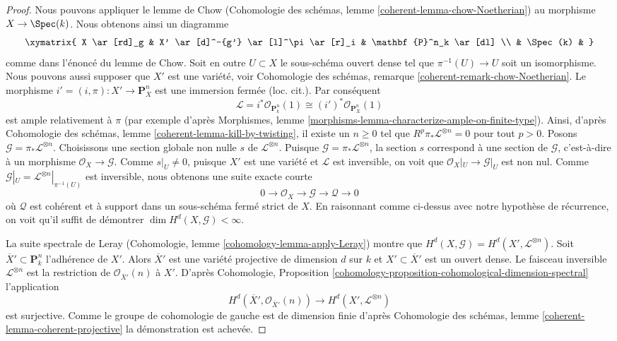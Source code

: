 \begin{proof}
\medskip\noindent
Nous pouvons appliquer le lemme de Chow
(Cohomologie des schémas, lemme \ref{coherent-lemma-chow-Noetherian})
au morphisme $X \to \Spec(k)$. Nous obtenons ainsi un diagramme
$$
\xymatrix{
X \ar[rd]_g & X' \ar[d]^-{g'} \ar[l]^\pi \ar[r]_i & \mathbf{P}^n_k \ar[dl] \\
& \Spec(k) &
}
$$
comme dans l'\'enonc\'e du lemme de Chow. Soit en outre $U \subset X$
le sous-sch\'ema ouvert dense tel que $\pi^{-1}(U) \to U$ soit un isomorphisme.
Nous pouvons aussi supposer que $X'$ est une vari\'et\'e, voir
Cohomologie des schémas, remarque \ref{coherent-remark-chow-Noetherian}.
Le morphisme $i' = (i, \pi) : X' \to \mathbf{P}^n_X$ est
une immersion ferm\'ee (loc. cit.). Par cons\'equent
$$
\mathcal{L} = i^*\mathcal{O}_{\mathbf{P}^n_k}(1) \cong
(i')^*\mathcal{O}_{\mathbf{P}^n_X}(1)
$$
est ample relativement \`a $\pi$ (par exemple d'apr\`es
Morphismes, lemme \ref{morphisms-lemma-characterize-ample-on-finite-type}).
Ainsi, d'apr\`es Cohomologie des schémas, lemme \ref{coherent-lemma-kill-by-twisting},
il existe un $n \geq 0$ tel que
$R^p\pi_*\mathcal{L}^{\otimes n} = 0$ pour tout $p > 0$.
Posons $\mathcal{G} = \pi_*\mathcal{L}^{\otimes n}$.
Choisissons une section globale non nulle $s$ de $\mathcal{L}^{\otimes n}$.
Puisque $\mathcal{G} = \pi_*\mathcal{L}^{\otimes n}$, la section $s$
correspond \`a une section de $\mathcal{G}$, c'est-\`a-dire \`a un morphisme
$\mathcal{O}_X \to \mathcal{G}$.
Comme $s|_U \not = 0$, puisque $X'$ est une vari\'et\'e et $\mathcal{L}$ est
inversible, on voit que $\mathcal{O}_X|_U \to \mathcal{G}|_U$
est non nul. Comme $\mathcal{G}|_U = \mathcal{L}^{\otimes n}|_{\pi^{-1}(U)}$
est inversible, nous obtenons une suite exacte courte
$$
0 \to \mathcal{O}_X \to \mathcal{G} \to \mathcal{Q} \to 0
$$
o\`u $\mathcal{Q}$ est coh\'erent et \`a support dans un sous-sch\'ema
ferm\'e strict de $X$. En raisonnant comme ci-dessus avec notre hypoth\`ese de
r\'ecurrence, on voit qu'il
suffit de d\'emontrer $\dim H^d(X, \mathcal{G}) < \infty$.

\medskip\noindent
La suite spectrale de Leray
(Cohomologie, lemme \ref{cohomology-lemma-apply-Leray})
montre que $H^d(X, \mathcal{G}) = H^d(X', \mathcal{L}^{\otimes n})$.
Soit $\overline{X}' \subset \mathbf{P}^n_k$ l'adh\'erence
de $X'$. Alors $\overline{X}'$ est une vari\'et\'e projective de dimension $d$
sur $k$ et $X' \subset \overline{X}'$ est un ouvert dense.
Le faisceau inversible $\mathcal{L}^{\otimes n}$ est la restriction de
$\mathcal{O}_{\overline{X}'}(n)$ \`a $X'$. D'apr\`es
Cohomologie, Proposition
\ref{cohomology-proposition-cohomological-dimension-spectral}
l'application
$$
H^d(\overline{X}', \mathcal{O}_{\overline{X}'}(n))
\longrightarrow
H^d(X', \mathcal{L}^{\otimes n})
$$
est surjective. Comme le groupe de cohomologie de gauche est
de dimension finie d'apr\`es
Cohomologie des schémas, lemme \ref{coherent-lemma-coherent-projective}
la d\'emonstration est achev\'ee.
\end{proof}

